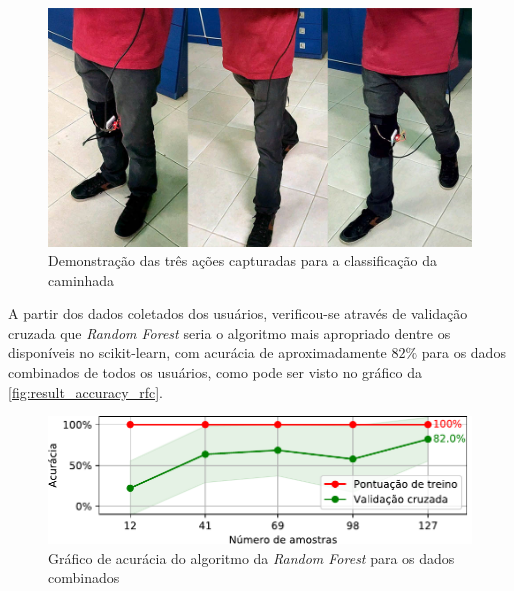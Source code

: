 \begin{figure}[ht]
	\caption{\label{fig:result_estados}Demonstração das três ações capturadas para a classificação da caminhada}
	\begin{center}
	    \includegraphics[width=\textwidth]{resources/result_estados}
	\end{center}
\end{figure}

A partir dos dados coletados dos usuários, verificou-se através de validação cruzada que \textit{Random Forest} seria o algoritmo mais apropriado dentre os disponíveis no scikit-learn, com acurácia de aproximadamente \(82\%\) para os dados combinados de todos os usuários, como pode ser visto no gráfico da \autoref{fig:result_accuracy_rfc}.

\begin{figure}[ht]
	\caption{\label{fig:result_accuracy_rfc}Gráfico de acurácia do algoritmo da \textit{Random Forest} para os dados combinados}
	\begin{center}
	    \includegraphics[width=\textwidth]{resources/result_accuracy_rfc}
	\end{center}
\end{figure}

